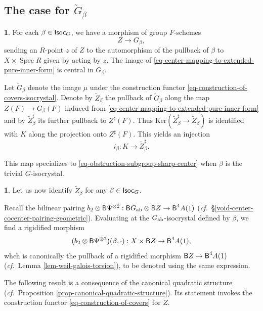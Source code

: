 \documentclass[10pt,english,reqno]{amsart}
\newcommand{\Isoc}{\textnormal{\textsf{Isoc}}}
\newcommand{\Ker}{\mathrm{Ker}}
\newcommand{\deloop}{\textnormal{\textsf{B}}}
\newcommand{\Spec}{\operatorname{Spec}}
\newcommand{\abelian}{\textnormal{ab}}
\theoremstyle{definition}
\numberwithin{equation}{section}
\newtheorem{untitledsubsubsection}[subsubsection]{}
\newenvironment{void}
{\begin{untitledsubsubsection}}
{\end{untitledsubsubsection}}
\begin{document}


\subsection{The case for $\widetilde G_{\beta}$}

\begin{void}
For each $\beta \in \Isoc_G$, we have a morphism of group $F$-schemes
\begin{equation}
\label{eq-center-mapping-to-extended-pure-inner-form}
Z \rightarrow G_{\beta},
\end{equation}
sending an $R$-point $z$ of $Z$ to the automorphism of the pullback of $\beta$ to $X\times \Spec R$ given by acting by $z$. The image of \eqref{eq-center-mapping-to-extended-pure-inner-form} is central in $G_{\beta}$.

Let $\widetilde G_{\beta}$ denote the image $\mu$ under the construction functor \eqref{eq-construction-of-covers-isocrystal}. Denote by $\widetilde Z_{\beta}$ the pullback of $\widetilde G_{\beta}$ along the map $Z(F) \rightarrow G_{\beta}(F)$ induced from \eqref{eq-center-mapping-to-extended-pure-inner-form} and by $\widetilde Z_{\beta}^{\sharp}$ its further pullback to $Z^{\sharp}(F)$. Thus $\Ker(\widetilde Z^{\sharp}_{\beta} \rightarrow \widetilde Z_{\beta})$ is identified with $K$ along the projection onto $Z^{\sharp}(F)$. This yields an injection
\begin{equation}
\label{eq-obstruction-subgroup-sharp-center-isocrystal}
i_{\beta} : K \rightarrow \widetilde Z^{\sharp}_{\beta}.
\end{equation}

This map specializes to \eqref{eq-obstruction-subgroup-sharp-center} when $\beta$ is the trivial $G$-isocrystal.
\end{void}


\begin{void}
Let us now identify $\widetilde Z_{\beta}$ for any $\beta \in \Isoc_G$.

Recall the bilinear pairing $b_2 \otimes \deloop\Psi^{\otimes 2} : \deloop G_{\abelian} \otimes \deloop Z \rightarrow \deloop^4A(1)$ (\emph{cf.}~\S\ref{void-center-cocenter-pairing-geometric}). Evaluating at the $G_{\abelian}$-isocrystal defined by $\beta$, we find a rigidified morphism
$$
(b_2\otimes \deloop\Psi^{\otimes 2})(\beta, \cdot) : X\times \deloop Z \rightarrow \deloop^4A(1),
$$
whch is canonically the pullback of a rigidified morphism $\deloop Z \rightarrow \deloop^4A(1)$ (\emph{cf.}~Lemma \ref{lem-weil-galois-torsion}), to be denoted using the same expression.

The following result is a consequence of the canonical quadratic structure (\emph{cf.}~Proposition \ref{prop-canonical-quadratic-structure}). Its statement invokes the construction functor \eqref{eq-construction-of-covers} for $Z$.
\end{void}
\end{document}
